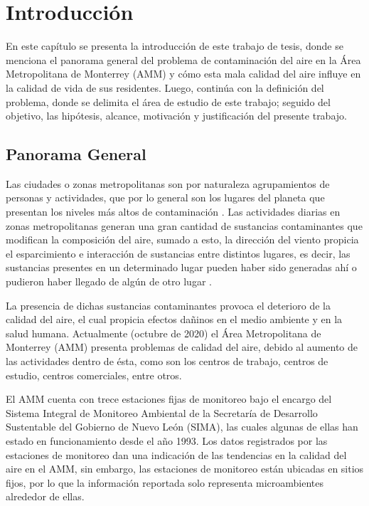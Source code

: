 \setlength{\parindent}{0pt}
\setlength{\parskip}{6mm}


\chapter{Introducción}

En este capítulo se presenta la introducción de este trabajo de tesis, donde se menciona el panorama general del problema de contaminación del aire en la Área Metropolitana de Monterrey (AMM) y cómo esta mala calidad del aire influye en la calidad de vida de sus residentes. Luego, continúa con la definición del problema, donde se delimita el área de estudio de este trabajo; seguido del objetivo, las hipótesis, alcance, motivación y justificación del presente trabajo.

\section{Panorama General}

Las ciudades o zonas metropolitanas son por naturaleza agrupamientos de personas y actividades, que por lo general son los lugares del planeta que presentan los niveles más altos de contaminación \citep{fenger}. Las actividades diarias en zonas metropolitanas generan una gran cantidad de sustancias contaminantes que modifican la composición del aire, sumado a esto, la dirección del viento propicia el esparcimiento e interacción de sustancias entre distintos lugares, es decir, las sustancias presentes en un determinado lugar pueden haber sido generadas ahí o pudieron  haber llegado de algún de otro lugar \citep{mayer}.

La presencia de dichas sustancias contaminantes provoca el deterioro de la calidad del aire, el cual propicia efectos dañinos en el medio ambiente y en la salud humana. Actualmente (octubre de 2020) el Área Metropolitana de Monterrey (AMM) presenta problemas de calidad del aire, debido al aumento de las actividades dentro de ésta, como son los centros de trabajo, centros de estudio, centros comerciales, entre otros.

El AMM cuenta con trece estaciones fijas de monitoreo bajo el encargo del Sistema Integral de Monitoreo Ambiental de la Secretaría de Desarrollo Sustentable del Gobierno de Nuevo León (SIMA), las cuales algunas de ellas han estado en funcionamiento desde el año 1993.  Los datos registrados por las estaciones de monitoreo dan una indicación de las tendencias en la calidad del aire en el AMM, sin embargo, las estaciones de monitoreo están ubicadas en sitios fijos, por lo que la información reportada solo representa microambientes alrededor de ellas.

